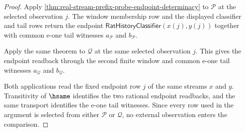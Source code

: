 \begin{proof}
Apply \autoref{thm:real-stream-prefix-probe-endpoint-determinacy} to
$\mathcal P$ at the selected observation $j$. The window membership row and
the displayed classifier and tail rows return the endpoint
$\mathsf{RatHistoryClassifier}(x(j),y(j))$ together with common e-one tail
witnesses $a_{\mathcal P}$ and $b_{\mathcal P}$.

Apply the same theorem to $\mathcal Q$ at the same selected observation $j$.
This gives the endpoint readback through the second finite window and common
e-one tail witnesses $a_{\mathcal Q}$ and $b_{\mathcal Q}$.

Both applications read the fixed endpoint row $j$ of the same streams $x$ and
$y$. Transitivity of $\hsame$ identifies the two rational endpoint readbacks,
and the same transport identifies the e-one tail witnesses. Since every row
used in the argument is selected from either $\mathcal P$ or $\mathcal Q$, no
external observation enters the comparison.
\end{proof}

